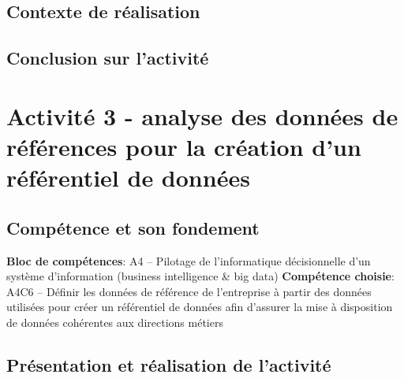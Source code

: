 \documentclass[a4paper, 11pt]{report}
\begin{document}
\subsection{Contexte de réalisation}
\subsection{Conclusion sur l'activité}

\section{Activité 3 - analyse des données de références pour la création d'un référentiel de données}
\subsection{Compétence et son fondement}
\textbf{Bloc de compétences}: A4 – Pilotage de l’informatique décisionnelle d’un système d’information (business intelligence & big data)
\newline
\textbf{Compétence choisie}: A4C6 – Définir les données de référence de l’entreprise à partir des données utilisées pour créer un référentiel de données afin d’assurer la mise à disposition de données cohérentes aux directions métiers
\subsection{Présentation et réalisation de l'activité}
\end{document}
